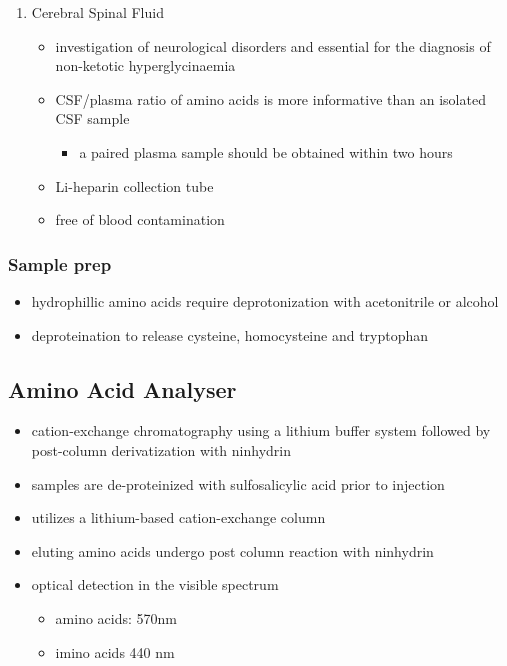 \documentclass[12pt]{scrartcl}
\begin{document}
\begin{enumerate}
\item Cerebral Spinal Fluid
\label{sec:org59db817}
\begin{itemize}
\item investigation of neurological disorders and essential for the
diagnosis of non-ketotic hyperglycinaemia
\item CSF/plasma ratio of amino acids is more informative than an isolated CSF sample
\begin{itemize}
\item a paired plasma sample should be obtained within two hours
\end{itemize}
\item Li-heparin collection tube
\item free of blood contamination
\end{itemize}
\end{enumerate}

\subsubsection{Sample prep}
\label{sec:org18d9d74}
\begin{itemize}
\item hydrophillic amino acids require deprotonization with acetonitrile or alcohol
\item deproteination to release cysteine, homocysteine and tryptophan
\end{itemize}

\subsection{Amino Acid Analyser}
\label{sec:org72fbf22}
\begin{itemize}
\item cation-exchange chromatography using a lithium buffer system
followed by post-column derivatization with ninhydrin
\item samples are de-proteinized with sulfosalicylic acid prior to
injection
\item utilizes a lithium-based cation-exchange column
\item eluting amino acids undergo post column reaction with ninhydrin
\item optical detection in the visible spectrum
\begin{itemize}
\item amino acids: 570nm
\item imino acids 440 nm
\end{itemize}
\end{itemize}
\end{document}

